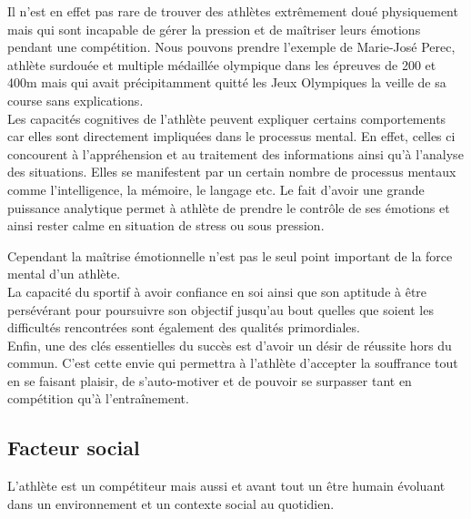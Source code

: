             Il n'est en effet pas rare de trouver des athlètes extrêmement doué physiquement mais qui sont incapable de gérer la pression et de maîtriser leurs émotions pendant une compétition. Nous pouvons prendre l'exemple de Marie-José Perec, athlète surdouée et multiple médaillée olympique dans les épreuves de 200 et 400m mais qui avait précipitamment quitté les Jeux Olympiques la veille de sa course sans explications.\\
            
            Les capacités cognitives de l'athlète peuvent expliquer certains comportements car elles sont directement impliquées dans le processus mental. En effet, celles ci concourent à l’appréhension et au traitement des informations ainsi qu'à l’analyse des situations. Elles se manifestent par un certain nombre de processus mentaux comme l’intelligence, la mémoire, le langage etc. Le fait d'avoir une grande puissance analytique permet à athlète de prendre le contrôle de ses émotions et ainsi rester calme en situation de stress ou sous pression.
         
            Cependant la maîtrise émotionnelle n'est pas le seul point important de la force mental d'un athlète.\\
            
            La capacité du sportif à avoir confiance en soi ainsi que son aptitude à être persévérant pour poursuivre son objectif jusqu’au bout quelles que soient les difficultés rencontrées sont également des qualités primordiales.\\
            
            Enfin, une des clés essentielles du succès est d'avoir un désir de réussite hors du commun. C'est cette envie qui permettra à l'athlète d'accepter la souffrance tout en se faisant plaisir, de s'auto-motiver et de pouvoir se surpasser tant en compétition qu'à l'entraînement.\\
            
                
        \vspace{10pt}
                
                
        \subsection{Facteur social}
            
            L'athlète est un compétiteur mais aussi et avant tout un être humain évoluant dans un environnement et un contexte social au quotidien.\\
            

